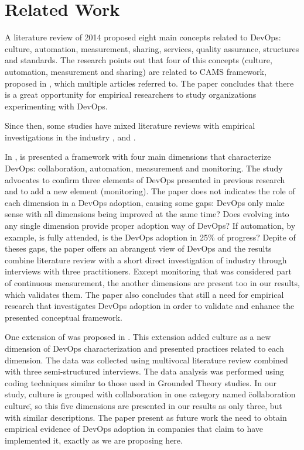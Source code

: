 \section{Related Work} \label{sec:related_work}

A literature review of 2014 \cite{cooperation_dev_ops_esem_2014} proposed eight main concepts related to DevOps: culture, automation, measurement, sharing, services, quality assurance, structures and standards. The research points out that four of this concepts (culture, automation, measurement and sharing) are related to CAMS framework, proposed in \cite{what_devops_means_2010}, which multiple articles referred to. The paper concludes that there is a great opportunity for empirical researchers to study organizations experimenting with DevOps.

Since then, some studies have mixed literature reviews with empirical investigations in the industry \cite{devops_a_definition_xp_15}, \cite{qualitative_devops_journalsw_17} and \cite{dimensions_of_devops_xp_15}.

In \cite{dimensions_of_devops_xp_15}, is presented a framework with four main dimensions that characterize DevOps: collaboration, automation, measurement and monitoring. The study advocates to confirm three elements of DevOps presented in previous research and to add a new element (monitoring). The paper does not indicates the role of each dimension in a DevOps adoption, causing some gaps: DevOps only make sense with all dimensions being improved at the same time? Does evolving into any single dimension provide proper adoption way of DevOps? If automation, by example, is fully attended, is the DevOps adoption in 25\% of progress? Depite of theses gaps, the paper offers an abrangent view of DevOps and the results combine literature review with a short direct investigation of industry through interviews with three practitioners. Except monitoring that was considered part of continuous measurement, the another dimensions are present too in our results, which validates them. The paper also concludes that still a need for empirical research that investigates DevOps adoption in order to validate and enhance the presented conceptual framework.

One extension of \cite{dimensions_of_devops_xp_15} was proposed in \cite{extending_dimensions_icsea_16}. This extension added culture as a new dimension of DevOps characterization and presented practices related to each dimension. The data was collected using multivocal literature review combined with three semi-structured interviews. The data analysis was performed using coding techniques similar to those used in Grounded Theory studies. In our study, culture is grouped with collaboration in one category named \"collaboration culture\", so this five dimensions are presented in our results as only three, but with similar descriptions. The paper present as future work the need to obtain empirical evidence of DevOps adoption in companies that claim to have implemented it, exactly as we are proposing here.

